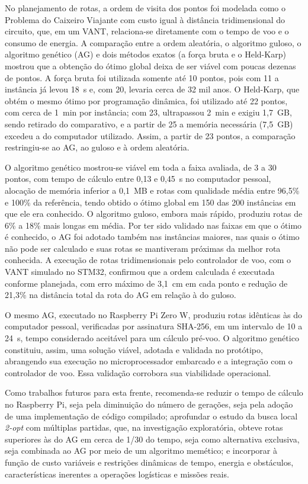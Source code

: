 
No planejamento de rotas, a ordem de visita dos pontos foi modelada como o Problema do Caixeiro Viajante com custo igual à distância tridimensional do circuito, que, em um VANT, relaciona-se diretamente com o tempo de voo e o consumo de energia. A comparação entre a ordem aleatória, o algoritmo guloso, o algoritmo genético (AG) e dois métodos exatos (a força bruta e o Held-Karp) mostrou que a obtenção do ótimo global deixa de ser viável com poucas dezenas de pontos. A força bruta foi utilizada somente até 10 pontos, pois com 11 a instância já levou 18~s e, com 20, levaria cerca de 32 mil anos. O Held-Karp, que obtém o mesmo ótimo por programação dinâmica, foi utilizado até 22 pontos, com cerca de 1~min por instância; com 23, ultrapassou 2~min e exigiu 1,7~GB, sendo retirado do comparativo, e a partir de 25 a memória necessária (7,5~GB) excedeu a do computador utilizado. Assim, a partir de 23 pontos, a comparação restringiu-se ao AG, ao guloso e à ordem aleatória.

O algoritmo genético mostrou-se viável em toda a faixa avaliada, de 3 a 30 pontos, com tempo de cálculo entre 0,13 e 0,45~s no computador pessoal, alocação de memória inferior a 0,1~MB e rotas com qualidade média entre 96,5\% e 100\% da referência, tendo obtido o ótimo global em 150 das 200 instâncias em que ele era conhecido. O algoritmo guloso, embora mais rápido, produziu rotas de 6\% a 18\% mais longas em média. Por ter sido validado nas faixas em que o ótimo é conhecido, o AG foi adotado também nas instâncias maiores, nas quais o ótimo não pode ser calculado e suas rotas se mantiveram próximas da melhor rota conhecida. A execução de rotas tridimensionais pelo controlador de voo, com o VANT simulado no STM32, confirmou que a ordem calculada é executada conforme planejada, com erro máximo de 3,1~cm em cada ponto e redução de 21,3\% na distância total da rota do AG em relação à do guloso.

O mesmo AG, executado no Raspberry Pi Zero W, produziu rotas idênticas às do computador pessoal, verificadas por assinatura SHA-256, em um intervalo de 10 a 24~s, tempo considerado aceitável para um cálculo pré-voo. O algoritmo genético constituiu, assim, uma solução viável, adotada e validada no protótipo, abrangendo sua execução no microprocessador embarcado e a integração com o controlador de voo. Essa validação corrobora sua viabilidade operacional.

Como trabalhos futuros para esta frente, recomenda-se reduzir o tempo de cálculo no Raspberry Pi, seja pela diminuição do número de gerações, seja pela adoção de uma implementação de código compilado; aprofundar o estudo da busca local \textit{2-opt} com múltiplas partidas, que, na investigação exploratória, obteve rotas superiores às do AG em cerca de 1/30 do tempo, seja como alternativa exclusiva, seja combinada ao AG por meio de um algoritmo memético; e incorporar à função de custo variáveis e restrições dinâmicas de tempo, energia e obstáculos, características inerentes a operações logísticas e missões reais.
